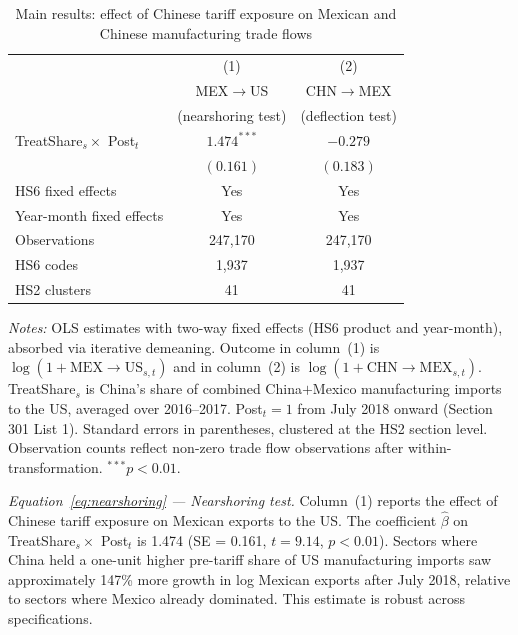 \documentclass[11pt]{article}
\begin{document}
\begin{table}[tbp]
\centering
\caption{Main results: effect of Chinese tariff exposure on Mexican and
         Chinese manufacturing trade flows}
\label{tab:main}
\begin{threeparttable}

\begin{tabular}{lcc}
\toprule
 & (1) & (2) \\
 & MEX$\to$US & CHN$\to$MEX \\
 & (nearshoring test) & (deflection test) \\
\midrule
TreatShare$_s \times$ Post$_t$
    & $1.474^{***}$ & $-0.279$ \\
    & $(0.161)$     & $(0.183)$ \\[6pt]
\midrule
HS6 fixed effects        & Yes & Yes \\
Year-month fixed effects & Yes & Yes \\
Observations             & 247,170 & 247,170 \\
HS6 codes                & 1,937 & 1,937 \\
HS2 clusters             & 41 & 41 \\
\bottomrule
\end{tabular}

\begin{tablenotes}[flushleft]
\footnotesize
\item \textit{Notes:}
OLS estimates with two-way fixed effects (HS6 product and year-month),
absorbed via iterative demeaning.
Outcome in column~(1) is $\log(1 + \mathrm{MEX}\to\mathrm{US}_{s,t})$
and in column~(2) is $\log(1 + \mathrm{CHN}\to\mathrm{MEX}_{s,t})$.
TreatShare$_s$ is China's share of combined China$+$Mexico manufacturing
imports to the US, averaged over 2016--2017.
Post$_t = 1$ from July 2018 onward (Section 301 List 1).
Standard errors in parentheses, clustered at the HS2 section level.
Observation counts reflect non-zero trade flow observations after
within-transformation.
$^{***}p < 0.01$.
\end{tablenotes}

\end{threeparttable}
\end{table}

\textit{Equation~\eqref{eq:nearshoring} --- Nearshoring test.}
Column~(1) reports the effect of Chinese tariff exposure on Mexican
exports to the US. The coefficient $\hat{\beta}$ on
TreatShare$_s \times$ Post$_t$ is 1.474 (SE = 0.161, $t = 9.14$,
$p < 0.01$). Sectors where China held a one-unit higher pre-tariff share
of US manufacturing imports saw approximately 147\% more growth in log
Mexican exports after July 2018, relative to sectors where Mexico already
dominated. This estimate is robust across
specifications.
\end{document}
